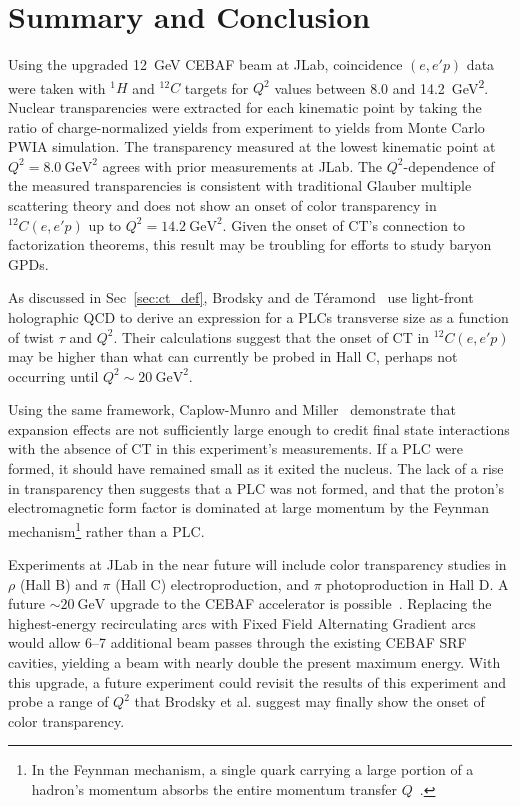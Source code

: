 \chapter{Summary and Conclusion}
Using the upgraded \SI{12}{\giga\electronvolt} CEBAF beam at JLab, coincidence
$(e,e'p)$ data were taken with $^{1}H$ and $^{12}C$ targets for $Q^2$ values
between 8.0 and \SI{14.2}{\giga\electronvolt\squared}.
Nuclear transparencies were extracted for each kinematic point by
taking the ratio of charge-normalized yields from experiment to yields from
Monte Carlo PWIA simulation.
The transparency measured at the lowest kinematic point at
$Q^2=\SI{8.0}{\giga\electronvolt\squared}$ agrees with prior measurements at
JLab.
The $Q^2$-dependence of the measured transparencies is consistent with
traditional Glauber multiple scattering theory and does not show an onset of
color transparency in $^{12}C(e,e'p)$ up to
$Q^2=\SI{14.2}{\giga\electronvolt\squared}$.
Given the onset of CT's connection to factorization theorems, this result may
be troubling for efforts to study baryon GPDs.


As discussed in Sec~\ref{sec:ct_def}, Brodsky and de Téramond~\cite{Brodsky_2021}
use light-front holographic QCD to derive an expression for a PLCs transverse
size as a function of twist $\tau$ and $Q^2$.
Their calculations suggest that the onset of CT in ${}^{12}C(e,e'p)$ may be
higher than what can currently be probed in Hall C, perhaps not occurring
until $Q^2\sim\SI{20}{\giga\electronvolt\squared}$.


Using the same framework, Caplow-Munro and Miller~\cite{CaplowMunro_2021}
demonstrate that expansion effects are not sufficiently large enough to credit
final state interactions with the absence of CT in this experiment's
measurements.
If a PLC were formed, it should have remained small as it exited the nucleus.
The lack of a rise in transparency then suggests that a PLC was not formed,
and that the proton's electromagnetic form factor is dominated at large
momentum by the Feynman mechanism\footnote{In the Feynman mechanism, a single
quark carrying a large portion of a hadron's momentum absorbs the entire
momentum transfer $Q$~\cite{Drell_1970}.} rather than a PLC.


Experiments at JLab in the near future will include color transparency studies
in $\rho$ (Hall B) and $\pi$ (Hall C) electroproduction, and $\pi$
photoproduction in Hall D.
A future $\sim\SI{20}{\giga\electronvolt}$ upgrade to the CEBAF accelerator is
possible~\cite{Bogacz_2020}.
Replacing the highest-energy recirculating arcs with Fixed Field Alternating
Gradient arcs would allow 6--7 additional beam passes through the existing
CEBAF SRF cavities, yielding a beam with nearly double the present maximum
energy.
With this upgrade, a future experiment could revisit the results of this
experiment and probe a range of $Q^2$ that Brodsky et al. suggest may finally
show the onset of color transparency.
